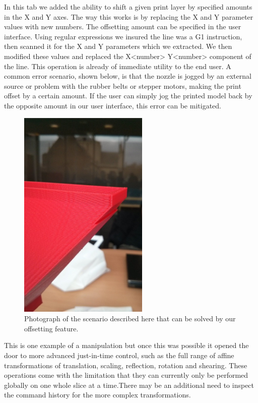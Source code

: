 \documentclass[11pt]{report} %
\begin{document}
In this tab we added the ability to shift a given print layer by specified amounts in the X and Y axes. The way this works is by replacing the X and Y parameter values with new numbers. The offsetting amount can be specified in the user interface. Using regular expressions we insured the line was a G1 instruction, then scanned it for the X and Y parameters which we extracted. We then modified these values and replaced the X<number> Y<number> component of the line.
This operation is already of immediate utility to the end user. A common error scenario, shown below, is that the nozzle is jogged by an external source or problem with the rubber belts or stepper motors, making the print offset by a certain amount. If the user can simply jog the printed model back by the opposite amount in our user interface, this error can be mitigated.

\begin{figure}[H]
  \centering
  \includegraphics[height=4in]{FoggerOffset.png}
  \caption{Photograph of the scenario described here that can be solved by our offsetting feature.}
  \label{figure:FoggerOffset}
\end{figure}

This is one example of a manipulation but once this was possible it opened the door to more advanced just-in-time control, such as the full range of affine transformations of translation, scaling, reflection, rotation and shearing. These operations come with the limitation that they can currently only be performed globally on one whole slice at a time.There may be an additional need to inspect the command history for the more complex transformations.
\end{document}
